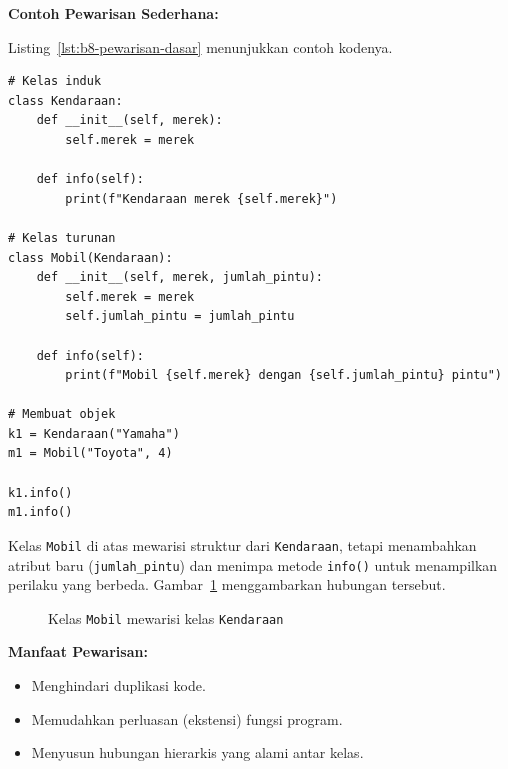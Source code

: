 \noindent\textbf{Contoh Pewarisan Sederhana:}

Listing~\ref{lst:b8-pewarisan-dasar} menunjukkan contoh kodenya.

\begin{lstlisting}[style=PythonStyle, caption={Contoh Pewarisan Dasar}, label={lst:b8-pewarisan-dasar}]
# Kelas induk
class Kendaraan:
    def __init__(self, merek):
        self.merek = merek

    def info(self):
        print(f"Kendaraan merek {self.merek}")

# Kelas turunan
class Mobil(Kendaraan):
    def __init__(self, merek, jumlah_pintu):
        self.merek = merek
        self.jumlah_pintu = jumlah_pintu

    def info(self):
        print(f"Mobil {self.merek} dengan {self.jumlah_pintu} pintu")

# Membuat objek
k1 = Kendaraan("Yamaha")
m1 = Mobil("Toyota", 4)

k1.info()
m1.info()
\end{lstlisting}

Kelas \texttt{Mobil} di atas mewarisi struktur dari \texttt{Kendaraan}, tetapi menambahkan atribut baru (\texttt{jumlah\_pintu}) dan menimpa metode \texttt{info()} untuk menampilkan perilaku yang berbeda. Gambar~\ref{fig:b8-pewarisan} menggambarkan hubungan tersebut.

\begin{figure}[H]
  \centering
  \caption{Kelas \texttt{Mobil} mewarisi kelas \texttt{Kendaraan}}
  \label{fig:b8-pewarisan}
\end{figure}

\noindent\textbf{Manfaat Pewarisan:}
\begin{itemize}
    \item Menghindari duplikasi kode.
    \item Memudahkan perluasan (ekstensi) fungsi program.
    \item Menyusun hubungan hierarkis yang alami antar kelas.
\end{itemize}

